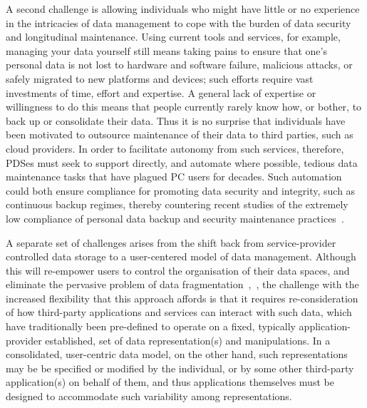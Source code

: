 \documentclass[graybox]{svmult}
\begin{document}
A second challenge is allowing individuals who might have little or no experience in the intricacies of data management to cope with the burden of data security and longitudinal maintenance.  Using current tools and services, for example, managing your data yourself still means taking pains to ensure that one's personal data is not lost to hardware and software failure, malicious attacks, or safely migrated to new platforms and devices; such efforts require vast investments of time, effort and expertise.  A general lack of expertise or willingness to do this  means that people currently rarely know how, or bother, to back up or consolidate their data. Thus it is no surprise that individuals have been motivated to outsource maintenance of their data to third parties, such as cloud providers.  In order to facilitate autonomy from such services, therefore, PDSes must seek to support directly, and automate where possible, tedious data maintenance tasks that have plagued PC users for decades.  Such automation could both ensure compliance for promoting data security and integrity, such as continuous backup regimes, thereby countering recent studies of the extremely low compliance of personal data backup and security maintenance practices~\cite{chervenak1998protecting, grasso2006survey}.

A separate set of challenges arises from the shift back from service-provider controlled data storage to a user-centered model of data management. Although this will re-empower users to control the organisation of their data spaces, and eliminate the pervasive problem of data fragmentation~\cite{karger2006data},~\cite{heath2011linked}, the challenge with the increased flexibility that this approach affords is that it requires re-consideration of how third-party applications and services can interact with such data, which have traditionally been pre-defined to operate on a fixed, typically application-provider established, set of data representation(s) and manipulations.  In a consolidated, user-centric data model, on the other hand, such representations may be be specified or modified by the individual, or by some other third-party application(s) on behalf of them, and thus applications themselves must be designed to accommodate such variability among representations.
\end{document}
